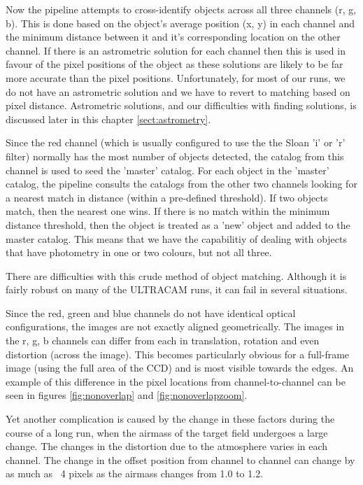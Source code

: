 Now the pipeline attempts to cross-identify objects across all three channels (r, g, b). This is done based on the object's average position (x, y) in each channel and the minimum distance between it and it's corresponding location on the other channel. If there is an astrometric solution for each channel then this is used in favour of the pixel positions of the object as these solutions are likely to be far more accurate than the pixel positions. Unfortunately, for most of our runs, we do not have an astrometric solution and we have to revert to matching based on pixel distance. Astrometric solutions, and our difficulties with finding solutions, is discussed later in this chapter \ref{sect:astrometry}.

Since the red channel (which is usually configured to use the the Sloan 'i' or 'r' filter) normally has the most number of objects detected, the catalog from this channel is used to seed the 'master' catalog. For each object in the 'master' catalog, the pipeline consults the catalogs from the other two channels looking for a nearest match in distance (within a pre-defined threshold). If two objects match, then the nearest one wins. If there is no match within the minimum distance threshold, then the object is treated as a 'new' object and added to the master catalog. This means that we have the capabilitiy of dealing with objects that have photometry in one or two colours, but not all three. 

There are difficulties with this crude method of object matching. Although it is fairly robust on many of the ULTRACAM runs, it can fail in several situations. 

Since the red, green and blue channels do not have identical optical configurations, the images are not exactly aligned geometrically. The images in the r, g, b channels can differ from each in translation, rotation and even distortion (across the image). This becomes particularly obvious for a full-frame image (using the full area of the CCD) and is most visible towards the edges. An example of this difference in the pixel locations from channel-to-channel can be seen in figures \ref{fig:nonoverlap} and \ref{fig:nonoverlapzoom}.

Yet another complication is caused by the change in these factors during the course of a long run, when the airmass of the target field undergoes a large change. The changes in the distortion due to the atmosphere varies in each channel. The change in the offset position from channel to channel can change by as much as ~4 pixels as the airmass changes from 1.0 to 1.2. 

